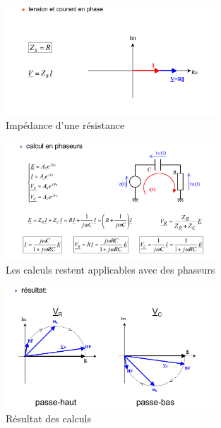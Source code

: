 \documentclass[a4paper]{article}
\begin{document}
            \begin{figure}[H]
                \begin{center}
                    \includegraphics[width=0.7\textwidth]{fig/2_impedance_R.png}
                    \caption{Impédance d'une résistance}
                    \label{fig:2_superposition}
                \end{center}
            \end{figure}
            \begin{figure}[H]
                \begin{center}
                    \includegraphics[width=0.7\textwidth]{fig/2_calcul_phaseur1.png}
                    \caption{Les calculs restent applicables avec des phaseurs}
                    \label{fig:2_superposition}
                \end{center}
            \end{figure}
            \begin{figure}[H]
                \begin{center}
                    \includegraphics[width=0.7\textwidth]{fig/2_calcul_phaseur2.png}
                    \caption{Résultat des calculs}
                    \label{fig:2_superposition}
                \end{center}
            \end{figure}
\end{document}
